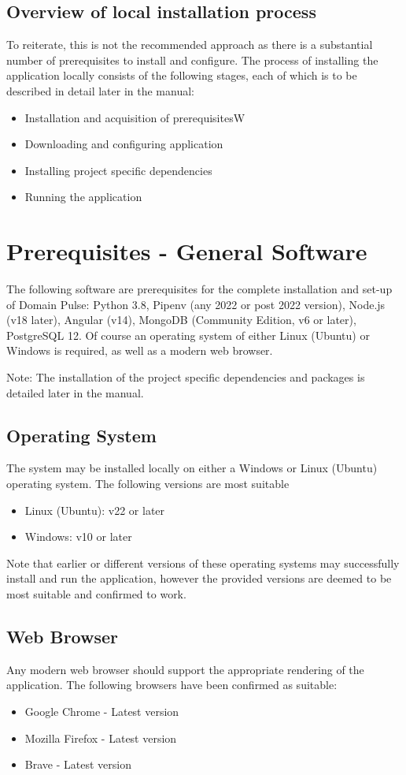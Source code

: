 \documentclass{article}
\begin{document}
\subsection{Overview of local installation process}
To reiterate, this is not the recommended approach as there is a substantial number of prerequisites to install and configure.
The process of installing the application locally consists of the following stages, each of which is to be described in detail
later in the manual:
\begin{itemize}
    \item Installation and acquisition of prerequisitesW
    \item Downloading and configuring application
    \item Installing project specific dependencies
    \item Running the application
\end{itemize}

\section{Prerequisites - General Software}
The following software are prerequisites for the complete installation and set-up of Domain Pulse: Python 3.8, Pipenv (any 2022 or post 2022 version), Node.js (v18 later), Angular (v14), MongoDB (Community Edition, v6 or later), PostgreSQL 12.
Of course an operating system of either Linux (Ubuntu) or Windows is required, as well as a modern web browser.

Note: The installation of the project specific dependencies and packages is detailed later in the manual.

\subsection{Operating System}
The system may be installed locally on either a Windows or Linux (Ubuntu) operating system. The following versions are most suitable
\begin{itemize}
    \item Linux (Ubuntu): v22 or later
    \item Windows: v10 or later
\end{itemize}
Note that earlier or different versions of these operating systems may successfully install and run the application, however the provided
versions are deemed to be most suitable and confirmed to work.

\subsection{Web Browser}
Any modern web browser should support the appropriate rendering of the application. The following browsers have been confirmed as suitable:
\begin{itemize}
    \item Google Chrome - Latest version
    \item Mozilla Firefox - Latest version
    \item Brave - Latest version
\end{itemize}
\end{document}

